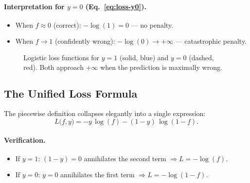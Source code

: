 \paragraph{Interpretation for $y=0$ (Eq.~\ref{eq:loss-y0}).}
\begin{itemize}
\item When $f\approx 0$ (correct): $-\log(1)=0$ — no penalty.
\item When $f\to 1$ (confidently wrong): $-\log(0)\to+\infty$ — catastrophic penalty.
\end{itemize}

\begin{figure}[h]
\centering
{}
\caption{Logistic loss functions for $y=1$ (solid, blue) and $y=0$ (dashed,
red). Both approach $+\infty$ when the prediction is maximally wrong.}
\label{fig:loss-curves}
\end{figure}

\subsection{The Unified Loss Formula}

The piecewise definition collapses elegantly into a single expression:
\begin{equation}
\boxed{L\bigl(f,y\bigr)
=-y\,\log(f)-(1-y)\,\log(1-f).}
\label{eq:unified-loss}
\end{equation}

\paragraph{Verification.}
\begin{itemize}
\item If $y=1$: $(1-y)=0$ annihilates the second term $\Rightarrow L=-\log(f)$.\checkmark
\item If $y=0$: $y=0$ annihilates the first term $\Rightarrow L=-\log(1-f)$.\checkmark
\end{itemize}

